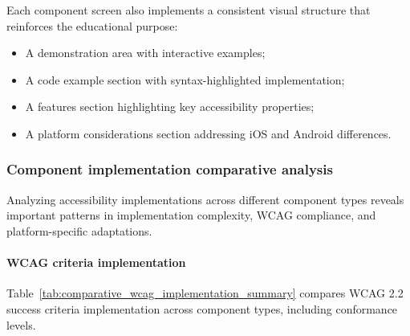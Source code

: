 Each component screen also implements a consistent visual structure that reinforces the educational purpose:

\begin{itemize}
    \item A demonstration area with interactive examples;
    \item A code example section with syntax-highlighted implementation;
    \item A features section highlighting key accessibility properties;
    \item A platform considerations section addressing iOS and Android differences.
\end{itemize}

\subsubsection{Component implementation comparative analysis}
\label{subsec:comparative-analysis}

Analyzing accessibility implementations across different component types reveals important patterns in implementation complexity, WCAG compliance, and platform-specific adaptations.

\paragraph{WCAG criteria implementation}

Table~\ref{tab:comparative_wcag_implementation_summary} compares WCAG 2.2 success criteria implementation across component types, including conformance levels.

